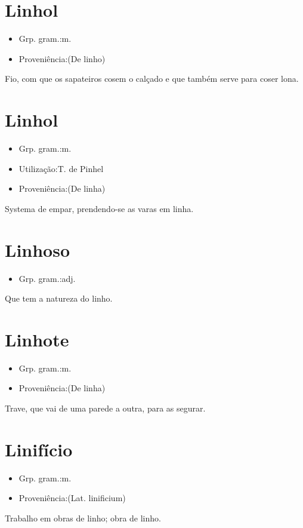 \section{Linhol}
\begin{itemize}
\item {Grp. gram.:m.}
\end{itemize}
\begin{itemize}
\item {Proveniência:(De \textunderscore linho\textunderscore )}
\end{itemize}
Fio, com que os sapateiros cosem o calçado e que também serve para coser lona.
\section{Linhol}
\begin{itemize}
\item {Grp. gram.:m.}
\end{itemize}
\begin{itemize}
\item {Utilização:T. de Pinhel}
\end{itemize}
\begin{itemize}
\item {Proveniência:(De \textunderscore linha\textunderscore )}
\end{itemize}
Systema de empar, prendendo-se as varas em linha.
\section{Linhoso}
\begin{itemize}
\item {Grp. gram.:adj.}
\end{itemize}
Que tem a natureza do linho.
\section{Linhote}
\begin{itemize}
\item {Grp. gram.:m.}
\end{itemize}
\begin{itemize}
\item {Proveniência:(De \textunderscore linha\textunderscore )}
\end{itemize}
Trave, que vai de uma parede a outra, para as segurar.
\section{Linifício}
\begin{itemize}
\item {Grp. gram.:m.}
\end{itemize}
\begin{itemize}
\item {Proveniência:(Lat. \textunderscore linificium\textunderscore )}
\end{itemize}
Trabalho em obras de linho; obra de linho.

